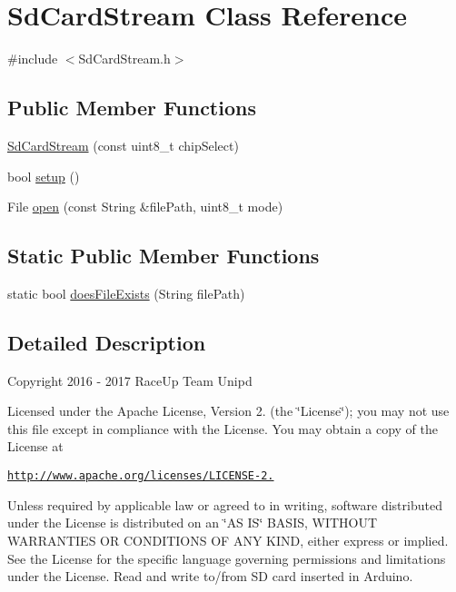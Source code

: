 \hypertarget{class_sd_card_stream}{}\section{Sd\+Card\+Stream Class Reference}
\label{class_sd_card_stream}


{\ttfamily \#include $<$Sd\+Card\+Stream.\+h$>$}

\subsection*{Public Member Functions}
\begin{DoxyCompactItemize}
\item 
\hyperlink{class_sd_card_stream_a0972fdeed91408cfd8b9daab58e1ef2a}{Sd\+Card\+Stream} (const uint8\+\_\+t chip\+Select)
\item 
bool \hyperlink{class_sd_card_stream_ab058227f98edd574579e911170f20464}{setup} ()
\item 
File \hyperlink{class_sd_card_stream_aeb1d8f51d6ae81703d2140f3f740e732}{open} (const String \&file\+Path, uint8\+\_\+t mode)
\end{DoxyCompactItemize}
\subsection*{Static Public Member Functions}
\begin{DoxyCompactItemize}
\item 
static bool \hyperlink{class_sd_card_stream_af275b7e608c7122279d8d2cc2c50f7f3}{does\+File\+Exists} (String file\+Path)
\end{DoxyCompactItemize}


\subsection{Detailed Description}
Copyright 2016 -\/ 2017 Race\+Up Team Unipd

Licensed under the Apache License, Version 2. (the \char`\"{}\+License\char`\"{}); you may not use this file except in compliance with the License. You may obtain a copy of the License at

\href{http://www.apache.org/licenses/LICENSE-2.0}{\tt http\+://www.\+apache.\+org/licenses/\+L\+I\+C\+E\+N\+S\+E-\/2.}

Unless required by applicable law or agreed to in writing, software distributed under the License is distributed on an \char`\"{}\+A\+S I\+S\char`\"{} B\+A\+S\+IS, W\+I\+T\+H\+O\+UT W\+A\+R\+R\+A\+N\+T\+I\+ES OR C\+O\+N\+D\+I\+T\+I\+O\+NS OF A\+NY K\+I\+ND, either express or implied. See the License for the specific language governing permissions and limitations under the License. Read and write to/from SD card inserted in Arduino. 

